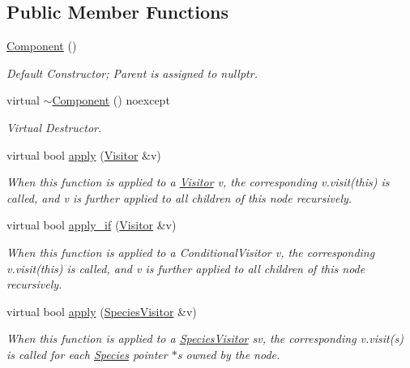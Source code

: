\subsection*{Public Member Functions}
\begin{DoxyCompactItemize}
\item 
\hyperlink{classchem_1_1Component_a2c7265280625c13151d52a500bcc3095}{Component} ()
\begin{DoxyCompactList}\small\item\em Default Constructor; Parent is assigned to nullptr. \end{DoxyCompactList}\item 
virtual \hyperlink{classchem_1_1Component_a9a468e72232a30a69d4432d13ac5ffa9}{$\sim$\-Component} () noexcept
\begin{DoxyCompactList}\small\item\em Virtual Destructor. \end{DoxyCompactList}\item 
virtual bool \hyperlink{classchem_1_1Component_ae9efcf2fb203ab7514f81f04d7e4dec2}{apply} (\hyperlink{classchem_1_1Visitor}{Visitor} \&v)
\begin{DoxyCompactList}\small\item\em When this function is applied to a \hyperlink{classchem_1_1Visitor}{Visitor} v, the corresponding v.\-visit(this) is called, and v is further applied to all children of this node recursively. \end{DoxyCompactList}\item 
virtual bool \hyperlink{classchem_1_1Component_af351fbf0deb48884c27806997f5954fd}{apply\-\_\-if} (\hyperlink{classchem_1_1Visitor}{Visitor} \&v)
\begin{DoxyCompactList}\small\item\em When this function is applied to a Conditional\-Visitor v, the corresponding v.\-visit(this) is called, and v is further applied to all children of this node recursively. \end{DoxyCompactList}\item 
virtual bool \hyperlink{classchem_1_1Component_aea52312b501cefd0fc2a26ff5671d711}{apply} (\hyperlink{classchem_1_1SpeciesVisitor}{Species\-Visitor} \&v)
\begin{DoxyCompactList}\small\item\em When this function is applied to a \hyperlink{classchem_1_1SpeciesVisitor}{Species\-Visitor} sv, the corresponding v.\-visit(s) is called for each \hyperlink{classchem_1_1Species}{Species} pointer $\ast$s owned by the node. \end{DoxyCompactList}\item 

\end{DoxyCompactItemize}
